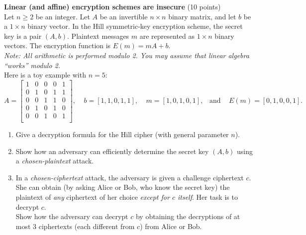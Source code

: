 \begin{problem}{\bf Linear (and affine) encryption schemes are insecure} (10 points)\\
Let $n \geq 2$ be an integer. Let $A$ be an invertible
$n \times n$ binary matrix, and let $b$ be a $1 \times n$ binary
vector. In the Hill symmetric-key encryption scheme, the secret
key is a pair $(A,b)$. Plaintext messages $m$ are represented as
$1 \times n$ binary vectors. The encryption function is
$E(m) = mA + b$.\\
\emph{Note: All arithmetic is performed modulo 2. You may assume
that linear algebra ``works'' modulo 2.}\\
Here is a toy example with $n=5$:
\[ A = \left[
       \begin{array}{ccccc}
       1&0&0&0&1\\
       0&1&0&1&1\\
       0&0&1&1&0\\
       0&1&0&1&0\\
       0&0&1&0&1\\
       \end{array} \right] ,
   \;\;\;\;
   b = [1,1,0,1,1],
   \;\;\;\;
   m = [1,0,1,0,1],
   \;\;\; \mbox{and } \;\;\; E(m) = [0,1,0,0,1].
\]
\begin{enumerate}[label=(\alph*)]
\item Give a decryption formula for the Hill cipher (with general
      parameter $n$).
\item Show how an adversary can efficiently determine the secret key
      $(A,b)$ using a \emph{chosen-plaintext} attack.
\item In a \emph{chosen-ciphertext} attack, the adversary is given a
      challenge ciphertext $c$. She can obtain (by asking Alice or Bob,
      who know the secret key) the plaintext of \emph{any} ciphertext of
      her choice \emph{except for $c$ itself}. Her task is to decrypt $c$.\\
      Show how the adversary can decrypt $c$ by obtaining the decryptions
      of at most 3 ciphertexts (each different from $c$) from Alice or Bob.
\end{enumerate}
\end{problem}

